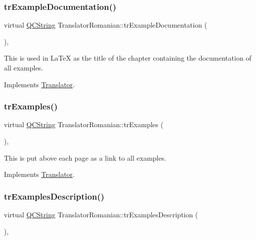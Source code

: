 \subsubsection{\texorpdfstring{trExampleDocumentation()}{trExampleDocumentation()}}
{\footnotesize\ttfamily virtual \mbox{\hyperlink{class_q_c_string}{Q\+C\+String}} Translator\+Romanian\+::tr\+Example\+Documentation (\begin{DoxyParamCaption}{ }\end{DoxyParamCaption})\hspace{0.3cm}{\ttfamily [inline]}, {\ttfamily [virtual]}}

This is used in La\+TeX as the title of the chapter containing the documentation of all examples. 

Implements \mbox{\hyperlink{class_translator}{Translator}}.

\mbox{\label{class_translator_romanian_ac450948232315dd746f9ee61d33b9b3f}} 
\subsubsection{\texorpdfstring{trExamples()}{trExamples()}}
{\footnotesize\ttfamily virtual \mbox{\hyperlink{class_q_c_string}{Q\+C\+String}} Translator\+Romanian\+::tr\+Examples (\begin{DoxyParamCaption}{ }\end{DoxyParamCaption})\hspace{0.3cm}{\ttfamily [inline]}, {\ttfamily [virtual]}}

This is put above each page as a link to all examples. 

Implements \mbox{\hyperlink{class_translator}{Translator}}.

\mbox{\label{class_translator_romanian_a3d7b4cc48d9bdd17794ba1a045567c35}} 
\subsubsection{\texorpdfstring{trExamplesDescription()}{trExamplesDescription()}}
{\footnotesize\ttfamily virtual \mbox{\hyperlink{class_q_c_string}{Q\+C\+String}} Translator\+Romanian\+::tr\+Examples\+Description (\begin{DoxyParamCaption}{ }\end{DoxyParamCaption})\hspace{0.3cm}{\ttfamily [inline]}, {\ttfamily [virtual]}}

